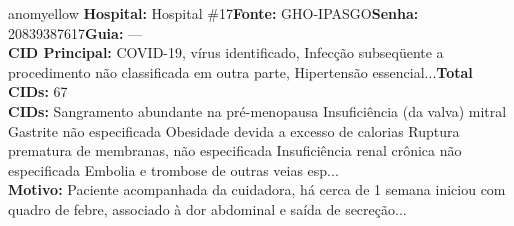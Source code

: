 \documentclass[a4paper,10pt]{article}
\begin{document}
\begin{anomalycard}[Interna\c{c}\~{a}o \#107 | Pac. \#136 | MODERADO (z=2.01) | LOS: 8d | 26/02/2026\,$\to$\,06/03/2026]{anomyellow}
\textbf{Hospital:} Hospital \#17\quad \textbf{Fonte:} GHO-IPASGO\quad \textbf{Senha:} 20839387617\quad \textbf{Guia:} ---\\

\textbf{CID Principal:} {\small COVID-19, vírus identificado, Infecção subseqüente a procedimento não classificada em outra parte, Hipertensão essencial...}\quad\textbf{Total CIDs:} 67\\

\textbf{CIDs:} {\scriptsize Sangramento abundante na pré-menopausa \textbar{} Insuficiência (da valva) mitral \textbar{} Gastrite não especificada \textbar{} Obesidade devida a excesso de calorias \textbar{} Ruptura prematura de membranas, não especificada \textbar{} Insuficiência renal crônica não especificada \textbar{} Embolia e trombose de outras veias esp...}\\

\textbf{Motivo:} {\scriptsize Paciente acompanhada da cuidadora, há cerca de 1 semana iniciou com quadro de febre, associado à dor abdominal e saída de secreção...}\\

\end{anomalycard}
\end{document}
